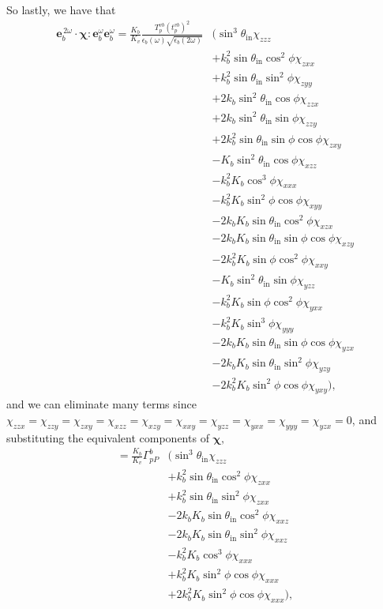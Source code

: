 So lastly, we have that
\begin{equation*}
\begin{split}
\mathbf{e}^{\,2\omega}_{b}\cdot
\boldsymbol{\chi}:\mathbf{e}^{\omega}_{b}\mathbf{e}^{\omega}_{b} =
\frac{K_{b}}{K_{v}}
\frac{T_{p}^{vb}\left(t^{vb}_{p}\right)^{2}}
     {\epsilon_{b}(\omega)\sqrt{\epsilon_{b}(2\omega)}}
&\big(
   \sin^{3}\theta_{\mathrm{in}}\chi_{zzz}\\
&+ k^{2}_{b}\sin\theta_{\mathrm{in}}\cos^{2}\phi\chi_{zxx}\\
&+ k^{2}_{b}\sin\theta_{\mathrm{in}}\sin^{2}\phi\chi_{zyy}\\
&+ 2k_{b}\sin^{2}\theta_{\mathrm{in}}\cos\phi\chi_{zzx}\\
&+ 2k_{b}\sin^{2}\theta_{\mathrm{in}}\sin\phi\chi_{zzy}\\
&+ 2k^{2}_{b}\sin\theta_{\mathrm{in}}\sin\phi\cos\phi\chi_{zxy}\\
&- K_{b}\sin^{2}\theta_{\mathrm{in}}\cos\phi\chi_{xzz}\\
&- k^{2}_{b}K_{b}\cos^{3}\phi\chi_{xxx}\\
&- k^{2}_{b}K_{b}\sin^{2}\phi\cos\phi\chi_{xyy}\\
&- 2k_{b}K_{b}\sin\theta_{\mathrm{in}}\cos^{2}\phi\chi_{xzx}\\
&- 2k_{b}K_{b}\sin\theta_{\mathrm{in}}\sin\phi\cos\phi\chi_{xzy}\\
&- 2k^{2}_{b}K_{b}\sin\phi\cos^{2}\phi\chi_{xxy}\\
&- K_{b}\sin^{2}\theta_{\mathrm{in}}\sin\phi\chi_{yzz}\\
&- k^{2}_{b}K_{b}\sin\phi\cos^{2}\phi\chi_{yxx}\\
&- k^{2}_{b}K_{b}\sin^{3}\phi\chi_{yyy}\\
&- 2k_{b}K_{b}\sin\theta_{\mathrm{in}}\sin\phi\cos\phi\chi_{yzx}\\
&- 2k_{b}K_{b}\sin\theta_{\mathrm{in}}\sin^{2}\phi\chi_{yzy}\\
&- 2k^{2}_{b}K_{b}\sin^{2}\phi\cos\phi\chi_{yxy}
\big),
\end{split}
\end{equation*}
and we can eliminate many terms since
$\chi_{zzx}=\chi_{zzy}=\chi_{zxy}=\chi_{xzz}=\chi_{xzy}=\chi_{xxy}=\chi_{yzz}
=\chi_{yxx}=\chi_{yyy}=\chi_{yzx}=0$, and substituting the equivalent
components of $\boldsymbol{\chi},$
\begin{equation*}
\begin{split}
=
\frac{K_{b}}{K_{v}}
\Gamma^{b}_{pP}
&\big(
   \sin^{3}\theta_{\mathrm{in}}\chi_{zzz}\\
&+ k^{2}_{b}\sin\theta_{\mathrm{in}}\cos^{2}\phi\chi_{zxx}\\
&+ k^{2}_{b}\sin\theta_{\mathrm{in}}\sin^{2}\phi\chi_{zxx}\\
&- 2k_{b}K_{b}\sin\theta_{\mathrm{in}}\cos^{2}\phi\chi_{xxz}\\
&- 2k_{b}K_{b}\sin\theta_{\mathrm{in}}\sin^{2}\phi\chi_{xxz}\\
&- k^{2}_{b}K_{b}\cos^{3}\phi\chi_{xxx}\\
&+ k^{2}_{b}K_{b}\sin^{2}\phi\cos\phi\chi_{xxx}\\
&+ 2k^{2}_{b}K_{b}\sin^{2}\phi\cos\phi\chi_{xxx}
\big),
\end{split}
\end{equation*}
